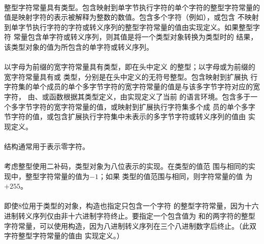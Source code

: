 {\semantic
\paragraph{}
整型字符常量具有类型。包含映射到单字节执行字符的单个字符的整型字符常量的
值是映射字符的表示被解释为整数的数值。包含多个字符（例如），或包含
不映射到单字节执行字符的字符或转义序列的整型字符常量的值由实现定义。如果整型字符
常量包含单字符或转义序列，则其值是将一个类型对象转换为类型时的
结果，该类型对象的值为所包含的单字符或转义序列。

\paragraph{}
以字母为前缀的宽字符常量具有类型，即在头中定义
的整型；以字母或为前缀的宽字符常量具有或
类型，分别是在头中定义的无符号整型。包含映射到扩展执
行字符集的单个成员的单个多字节字符的宽字符常量的值是与该多字节字符对应的宽字符，
由、或函数根据其类型定义，由实现定义了当前
的语言环境。包含多于一个多字节字符的宽字符常量的值，或映射到扩展执行字符集多个成
员的单个多字节字符的值，或包含扩展执行字符集中未表示的多字节字符或转义序列的值由
实现定义。

\paragraph{}
\ex 结构\tm{\sq\bs 0\sq}通常用于表示零字符。

\paragraph{}
\ex 考虑整型使用二补码，类型对象为八位表示的实现。在类型的值范
围与相同的实现中，整型字符常量的值为$-1$；如果
类型的值范围与相同，则字符常量的值
为$+255$。

\paragraph{}
\ex 即使8位用于类型的对象，构造也指定只包含一个字符
的整型字符常量，因为十六进制转义序列仅由非十六进制字符终止。要指定一个包含值为
和的两字符的整型字符常量，可以使用构造\tm{\sq\b
0223\sq}，因为八进制转义序列在三个八进制数字后终止。（此双字符整型字符常量的值由
实现定义。）

}
